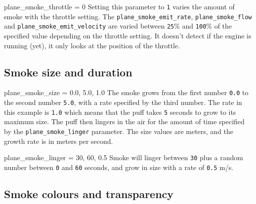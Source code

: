 \documentclass[a4paper,12pt]{article}
\newenvironment{vlist}[1]{%
\begin{list}{}{%
    \settowidth{\labelwidth}{\tt #1 }     %
    \setlength{\leftmargin}{\labelwidth}  %
    \addtolength{\leftmargin}{\labelsep}  %
    \setlength{\parsep}{0.5ex plus 0.2ex minus 0.2ex}
    \setlength{\itemsep}{0.3ex}
    \renewcommand{\makelabel}[1]{\color{headings}\tt ##1 \color{text1}\hfill}}}%
{\end{list}}
\begin{document}
\begin{vlist}{}
\item[plane\_smoke\_throttle = 0] Setting this parameter to \texttt{1}
  varies the amount of smoke with the throttle setting. The
  \texttt{plane\_smoke\_emit\_rate}, \texttt{plane\_smoke\_flow} and
  \texttt{plane\_smoke\_emit\_velocity} are varied between
  \texttt{25}\% and \texttt{100}\% of the specified value depending on
  the throttle setting. It doesn't detect if the engine is running
  (yet), it only looks at the position of the throttle.

\end{vlist}{}

\vspace{0.2cm}
\subsection*{\large{\textbf{Smoke size and duration}}}
\vspace{0.2cm}

\begin{vlist}{}

\item[plane\_smoke\_size = 0.0, 5.0, 1.0] The smoke grows from the
  first number \texttt{0.0} to the second number \texttt{5.0}, with a rate specified by the
  third number. The rate in this example is \texttt{1.0} which means
  that the puff takes \texttt{5} seconds to grow to its maximum size. The puff
  then lingers in the air for the amount of time specified by the
  \texttt{plane\_smoke\_linger} parameter. The size values are meters,
  and the growth rate is in meters per second.

\item[plane\_smoke\_linger = 30, 60, 0.5] Smoke will linger between \texttt{30} plus
  a random number between \texttt{0} and \texttt{60} seconds, and grow in size with a
  rate of \texttt{0.5} m/s.

\end{vlist}{}

\vspace{0.2cm}
\subsection*{\large{\textbf{Smoke colours and transparency}}}
\vspace{0.2cm}
\end{document}

